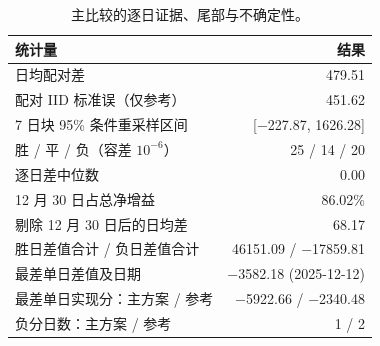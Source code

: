 \begin{table}[!htbp]
\centering\small
\caption{主比较的逐日证据、尾部与不确定性。}\label{tab:paired}
\begin{tabularx}{\linewidth}{@{}Xr@{}}
\toprule
统计量 & 结果 \\
\midrule
日均配对差 & 479.51 \\
配对 IID 标准误（仅参考） & 451.62 \\
7 日块 95\% 条件重采样区间 & [$-$227.87, 1626.28] \\
胜 / 平 / 负（容差 $10^{-6}$） & 25 / 14 / 20 \\
逐日差中位数 & 0.00 \\
12 月 30 日占总净增益 & 86.02\% \\
剔除 12 月 30 日后的日均差 & 68.17 \\
胜日差值合计 / 负日差值合计 & 46151.09 / $-$17859.81 \\
最差单日差值及日期 & $-$3582.18 (2025-12-12) \\
最差单日实现分：主方案 / 参考 & $-$5922.66 / $-$2340.48 \\
负分日数：主方案 / 参考 & 1 / 2 \\
\bottomrule
\end{tabularx}
\par\vspace{3pt}{\footnotesize 剔除单日是事后敏感性分析；主结果始终使用全部 59 日。区间未校正此前对评价期的多次观察。最差单日与负分日描述本时段已实现的下行，不是尾部风险模型。}
\end{table}

